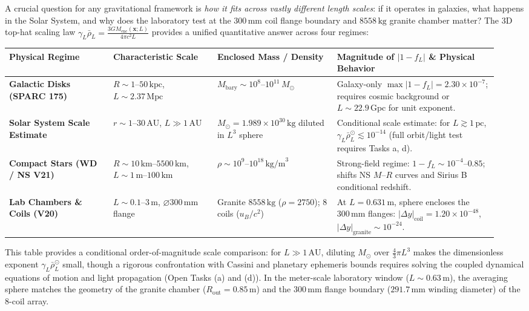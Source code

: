 \documentclass[10pt,a4paper]{article}
\begin{document}
\par
A crucial question for any gravitational framework is \emph{how it fits across vastly different length scales}: if it operates in galaxies, what happens in the Solar System, and why does the laboratory test at the $300\,\text{mm}$ coil flange boundary and $8558\,\text{kg}$ granite chamber matter? The 3D top-hat scaling law $\gamma_L \bar{\rho}_L = \frac{3 G M_{\text{enc}}(\mathbf{x};L)}{4\pi c^2 L}$ provides a unified quantitative answer across four regimes:
\begin{center}\vspace{-2pt}
{\footnotesize
\begin{tabular}{@{}>{\bfseries}p{0.20\linewidth}p{0.20\linewidth}p{0.23\linewidth}p{0.31\linewidth}@{}}
\toprule
Physical Regime & Characteristic Scale & Enclosed Mass / Density & Magnitude of $|1 - f_L|$ \& Physical Behavior \\
\midrule
Galactic Disks (SPARC 175) & $R \sim 1\text{--}50\,\text{kpc}$, $L \sim 2.37\,\text{Mpc}$ & $M_{\text{bary}} \sim 10^8\text{--}10^{11}\,M_\odot$ & Galaxy-only $\max|1-f_L| = 2.30\times 10^{-7}$; requires cosmic background or $L\sim 22.9\,\text{Gpc}$ for unit exponent. \\
Solar System Scale Estimate & $r \sim 1\text{--}30\,\text{AU}$, $L \gg 1\,\text{AU}$ & $M_\odot = 1.989\times 10^{30}\,\text{kg}$ diluted in $L^3$ sphere & Conditional scale estimate: for $L \gtrsim 1\,\text{pc}$, $\gamma_L\bar{\rho}_L^\odot \lesssim 10^{-14}$ (full orbit/light test requires Tasks a, d). \\
Compact Stars (WD / NS V21) & $R \sim 10\,\text{km}\text{--}5500\,\text{km}$, $L \sim 1\,\text{m}\text{--}100\,\text{km}$ & $\rho \sim 10^9\text{--}10^{18}\,\text{kg/m}^3$ & Strong-field regime: $1-f_L \sim 10^{-4}\text{--}0.85$; shifts NS $M$--$R$ curves and Sirius B conditional redshift. \\
Lab Chambers \& Coils (V20) & $L \sim 0.1\text{--}3\,\text{m}$, $\varnothing 300\,\text{mm}$ flange & Granite $8558\,\text{kg}$ ($\rho=2750$); 8 coils ($u_B/c^2$) & At $L=0.631\,\text{m}$, sphere encloses the $300\,\text{mm}$ flanges: $|\Delta y|_{\text{coil}}=1.20\times 10^{-48}$, $|\Delta y|_{\text{granite}}\sim 10^{-24}$. \\
\bottomrule
\end{tabular}}
\end{center}
This table provides a conditional order-of-magnitude scale comparison: for $L \gg 1\,\text{AU}$, diluting $M_\odot$ over $\frac{4}{3}\pi L^3$ makes the dimensionless exponent $\gamma_L\bar{\rho}_L^\odot$ small, though a rigorous confrontation with Cassini and planetary ephemeris bounds requires solving the coupled dynamical equations of motion and light propagation (Open Tasks (a) and (d)). In the meter-scale laboratory window ($L \sim 0.63\,\text{m}$), the averaging sphere matches the geometry of the granite chamber ($R_{\text{out}}=0.85\,\text{m}$) and the $300\,\text{mm}$ flange boundary ($291.7\,\text{mm}$ winding diameter) of the 8-coil array.
\newpage
\end{document}
